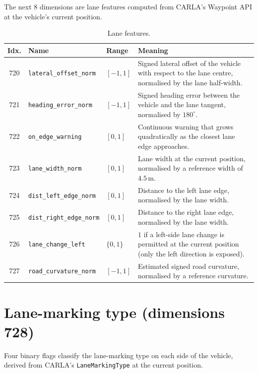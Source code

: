 The next \(8\) dimensions are lane features computed from CARLA's Waypoint API at the
vehicle's current position.

\begin{table}[H]
  \centering
  \caption{Lane features.}
  \label{tab:obs-lane}
  \small
  \begin{tabular}{@{}cllp{6cm}@{}}
    \toprule
    \textbf{Idx.} & \textbf{Name} & \textbf{Range} & \textbf{Meaning} \\
    \midrule
    720 & \texttt{lateral\_offset\_norm}    & \([-1, 1]\) & Signed lateral offset of the
        vehicle with respect to the lane centre, normalised by the lane half-width. \\
    721 & \texttt{heading\_error\_norm}     & \([-1, 1]\) & Signed heading error between the
        vehicle and the lane tangent, normalised by \(180^\circ\). \\
    722 & \texttt{on\_edge\_warning}        & \([0, 1]\) & Continuous warning that grows
        quadratically as the closest lane edge approaches. \\
    723 & \texttt{lane\_width\_norm}        & \([0, 1]\) & Lane width at the current
        position, normalised by a reference width of \(4.5\,\mathrm{m}\). \\
    724 & \texttt{dist\_left\_edge\_norm}   & \([0, 1]\) & Distance to the left lane edge,
        normalised by the lane width. \\
    725 & \texttt{dist\_right\_edge\_norm}  & \([0, 1]\) & Distance to the right lane edge,
        normalised by the lane width. \\
    726 & \texttt{lane\_change\_left}        & \(\{0, 1\}\) & \(1\) if a left-side lane change is
        permitted at the current position (only the left direction is exposed). \\
    727 & \texttt{road\_curvature\_norm}    & \([-1, 1]\) & Estimated signed road curvature,
        normalised by a reference curvature. \\
    \bottomrule
  \end{tabular}
\end{table}

\section{Lane-marking type (dimensions 728)}\label{app:obs-marking}

Four binary flags classify the lane-marking type on each side of the vehicle, derived from
CARLA's \texttt{LaneMarkingType} at the current position.


